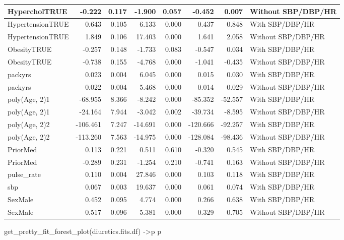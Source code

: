 \documentclass[
]{article}
\newenvironment{Shaded}{\begin{snugshade}}{\end{snugshade}}
\newcommand{\FunctionTok}[1]{\textcolor[rgb]{0.00,0.00,0.00}{#1}}
\newcommand{\NormalTok}[1]{#1}
\newcommand{\OtherTok}[1]{\textcolor[rgb]{0.56,0.35,0.01}{#1}}
\begin{document}
\begin{table}
\begin{tabular}[t]{l|r|r|r|r|r|r|l}
\hline
HypercholTRUE & -0.222 & 0.117 & -1.900 & 0.057 & -0.452 & 0.007 & Without SBP/DBP/HR\\
\hline
HypertensionTRUE & 0.643 & 0.105 & 6.133 & 0.000 & 0.437 & 0.848 & With SBP/DBP/HR\\
\hline
HypertensionTRUE & 1.849 & 0.106 & 17.403 & 0.000 & 1.641 & 2.058 & Without SBP/DBP/HR\\
\hline
ObesityTRUE & -0.257 & 0.148 & -1.733 & 0.083 & -0.547 & 0.034 & With SBP/DBP/HR\\
\hline
ObesityTRUE & -0.738 & 0.155 & -4.768 & 0.000 & -1.041 & -0.435 & Without SBP/DBP/HR\\
\hline
packyrs & 0.023 & 0.004 & 6.045 & 0.000 & 0.015 & 0.030 & With SBP/DBP/HR\\
\hline
packyrs & 0.022 & 0.004 & 5.468 & 0.000 & 0.014 & 0.029 & Without SBP/DBP/HR\\
\hline
poly(Age, 2)1 & -68.955 & 8.366 & -8.242 & 0.000 & -85.352 & -52.557 & With SBP/DBP/HR\\
\hline
poly(Age, 2)1 & -24.164 & 7.944 & -3.042 & 0.002 & -39.734 & -8.595 & Without SBP/DBP/HR\\
\hline
poly(Age, 2)2 & -106.461 & 7.247 & -14.691 & 0.000 & -120.666 & -92.257 & With SBP/DBP/HR\\
\hline
poly(Age, 2)2 & -113.260 & 7.563 & -14.975 & 0.000 & -128.084 & -98.436 & Without SBP/DBP/HR\\
\hline
PriorMed & 0.113 & 0.221 & 0.511 & 0.610 & -0.320 & 0.545 & With SBP/DBP/HR\\
\hline
PriorMed & -0.289 & 0.231 & -1.254 & 0.210 & -0.741 & 0.163 & Without SBP/DBP/HR\\
\hline
pulse\_rate & 0.110 & 0.004 & 27.846 & 0.000 & 0.103 & 0.118 & With SBP/DBP/HR\\
\hline
sbp & 0.067 & 0.003 & 19.637 & 0.000 & 0.061 & 0.074 & With SBP/DBP/HR\\
\hline
SexMale & 0.452 & 0.095 & 4.774 & 0.000 & 0.266 & 0.638 & With SBP/DBP/HR\\
\hline
SexMale & 0.517 & 0.096 & 5.381 & 0.000 & 0.329 & 0.705 & Without SBP/DBP/HR\\
\hline
\end{tabular}
\end{table}

\begin{Shaded}
\begin{Highlighting}[]
\FunctionTok{get\_pretty\_fit\_forest\_plot}\NormalTok{(diuretics.fits.df) }\OtherTok{{-}\textgreater{}}\NormalTok{p}
\NormalTok{p}
\end{Highlighting}
\end{Shaded}
\end{document}

